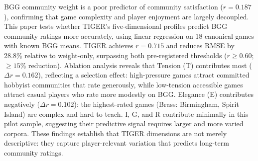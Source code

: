 BGG community weight is a poor predictor of community satisfaction ($r = 0.187$),
confirming that game complexity and player enjoyment are largely decoupled.
This paper tests whether TIGER's five-dimensional profiles predict BGG community ratings
more accurately, using linear regression on 18 canonical games with known BGG means.
TIGER achieves $r = 0.715$ and reduces RMSE by 28.8\% relative to weight-only,
surpassing both pre-registered thresholds ($r \geq 0.60$; $\geq 15\%$ reduction).
Ablation analysis reveals that Tension (T) contributes most ($\Delta r = 0.162$),
reflecting a selection effect: high-pressure games attract committed hobbyist communities
that rate generously, while low-tension accessible games attract casual players who rate
more modestly on BGG. Elegance (E) contributes negatively ($\Delta r = 0.102$):
the highest-rated games (Brass: Birmingham, Spirit Island) are complex and hard to teach.
I, G, and R contribute minimally in this pilot sample, suggesting their predictive
signal requires larger and more varied corpora.
These findings establish that TIGER dimensions are not merely descriptive:
they capture player-relevant variation that predicts long-term community ratings.
